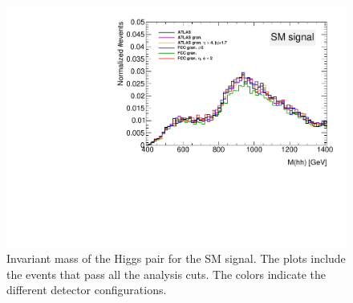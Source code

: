\begin{figure}
	\centering
	\includegraphics[width=0.5\linewidth]{./Figures/Mhh_after.pdf}
	\caption{Invariant mass of the Higgs pair for the SM signal. The plots include the events that pass all the analysis cuts. The colors indicate the different detector configurations.}
	\label{fig:CompGran_Mhh}
\end{figure}

